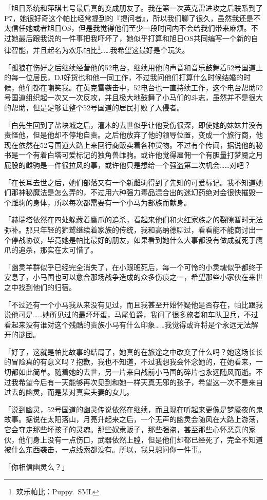 {「旭日系统和萍琪七号最后真的变成朋友了。我在第一次英克雷进攻之后联系到了P7，她很好奇这个帕比经常提到的『提问者』，所以我们聊了很久，虽然我还是不太信任她或者旭日OS，但是我觉得他们至少一段时间内不会给我们带来麻烦。不过她最后跟我说的一件事把我吓坏了，她似乎打算和旭日OS共同编写一个新的自律智能，并且起名为欢乐帕比\footnote{欢乐帕比：Puppy.~SML}……我希望这最好是个玩笑。

「孤狼在伤好之后继续经营他的52电台，继续用他的声音和音乐鼓舞着52号国道上的每一位居民，DJ好货也和他一同工作，不过我问他们打算什么时候结婚的时候，他们都在嘲笑我。在英克雷袭击中，52电台也一直持续工作，这个电台帮助52号国道组织起一次又一次反攻，并且极大地鼓舞了小马们的斗志，虽然并不是很大的帮助，但是足够让整个52号国道的居民打败了入侵者。

「白先生回到了盐块城之后，灌木的去世似乎让他受伤很深，即使她的妹妹并没有责怪他，但是他却不停地自责。之后他放弃了他的领导位置，变成一个旅行商，他现在依然在52号国道大路上来回行商贩卖着各种货物。不过有个传闻，据说他的秘书是一个有着白塔可爱标记的独角兽雌驹。或许他觉得雇佣一个有胆量打梦魇之月屁股的雌驹是一件很拉风的事，或许他只是想给一个强盗第二次机会……对吧？

「在长耳去世之后，她们部落又有一个新雌驹得到了先知的可爱标记。我不知道她们那神秘魔法是怎么弄的，不过用六种强力毒品混合出的迷幻药绝对会很快摧毁一个雌驹的身体，所以每次都需要有一个小马为部族而献身。

「赫瑞塔依然在四处躲藏着鹰爪的追杀，看起来他们和火红家族之的裂隙暂时无法弥补。那只年轻的狮鹫继续着家族的传统，我和高纳德聊过，看看能不能商讨出一个停战协议，毕竟她是帕比最好的朋友，如果看到她什么大事都没有做成就死于鹰爪的追杀，那实在太可惜了。

「幽灵羊群似乎已经完全消失了，在小跟班死后，每一个可怜的小灵魂似乎都终于安息了，小马国也可以愈合那场战争造成的众多伤痕之一，希望那些小家伙在来世之中找到他们的归宿。

「不过还有一个小马我从来没有见过，而且我甚至开始怀疑他是否存在，帕比跟我说他可是……她所见过的最坏坏蛋，马尾伯爵，我问了很多旅者和车队卫兵，不过看起来没有谁对这个残酷的贵族小马有什么印象……我觉得或许将是个永远无法解开的谜团。

「好了，这就是帕比故事的结局了，她真的在旅途之中改变了什么吗？她这场长长的冒险真的有意义吗？抱歉，我也不知道，不过我想我会怀念她的，在她看来，一切都如此简单。随着她的去世，另一片来自战前小马国的碎片也永远随风而逝。不过我希望今后有一天能够再次见到和她一样天真无邪的孩子，希望这一次不是来自过去的幽灵，而是某对真实夫妻的女儿。

「说到幽灵，52号国道的幽灵传说依然在继续，而且现在听起来更像是梦魇夜的鬼故事。据说在太阳落山，月亮升起来之后，一个无声的幽灵会随风在大路上游荡，它会夺走那些坏孩子的灵魂。那些奴隶贩子，那些强盗，甚至那些心怀恶意的家伙，他们身上没有一点伤口，武器依然上膛，但是他们却都已经死了，完全不知道被什么东西袭击，一点线索都没有。所以，我只想问你一件事。

「你相信幽灵么？」

}

